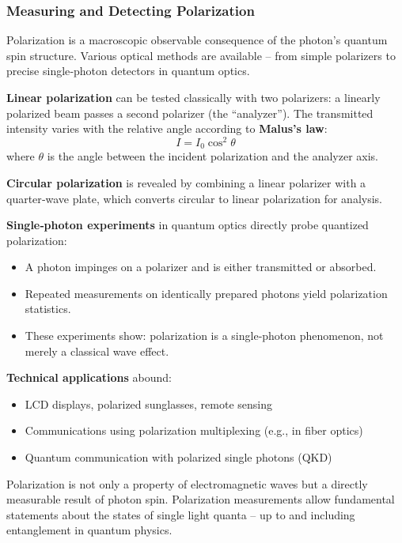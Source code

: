 \subsubsection{Measuring and Detecting Polarization}

Polarization is a macroscopic observable consequence of the photon’s quantum spin structure. Various optical methods are available – from simple polarizers to precise single‑photon detectors in quantum optics.

\vspace{0.5em}
\textbf{Linear polarization} can be tested classically with two polarizers: a linearly polarized beam passes a second polarizer (the “analyzer”). The transmitted intensity varies with the relative angle according to \textbf{Malus’s law}:
$$
I = I_0 \cos^2\theta
$$
where \( \theta \) is the angle between the incident polarization and the analyzer axis.

\vspace{0.5em}
\textbf{Circular polarization} is revealed by combining a linear polarizer with a quarter‑wave plate, which converts circular to linear polarization for analysis.

\vspace{0.5em}
\textbf{Single‑photon experiments} in quantum optics directly probe quantized polarization:
\begin{itemize}
	\item A photon impinges on a polarizer and is either transmitted or absorbed.
	\item Repeated measurements on identically prepared photons yield polarization statistics.
	\item These experiments show: polarization is a single‑photon phenomenon, not merely a classical wave effect.
\end{itemize}

\vspace{0.5em}
\textbf{Technical applications} abound:
\begin{itemize}
	\item LCD displays, polarized sunglasses, remote sensing
	\item Communications using polarization multiplexing (e.g., in fiber optics)
	\item Quantum communication with polarized single photons (QKD)
\end{itemize}

\begin{tcolorbox}[physikbox, title=What Polarization Reveals About Photons]
	\label{box:Was uns die}
	Polarization is not only a property of electromagnetic waves but a directly measurable result of photon spin. Polarization measurements allow fundamental statements about the states of single light quanta – up to and including entanglement in quantum physics.
\end{tcolorbox}

